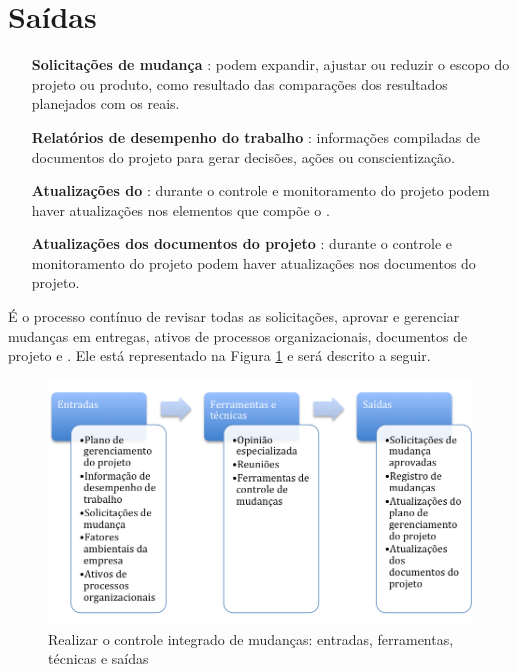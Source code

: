 \section{Saídas}

\begin{itemize}
	

	\item[\textbf{Solicitações de mudança}] : podem expandir, ajustar ou reduzir o escopo do projeto ou produto, como resultado das comparações dos resultados planejados com os reais.
	
	\item[\textbf{Relatórios de desempenho do trabalho}] : informações compiladas de documentos do projeto para gerar decisões, ações ou conscientização.

	\item[\textbf{Atualizações do \planproj}] :	durante o controle e monitoramento do projeto podem haver atualizações nos elementos que compõe o \planproj.
	
	\item[\textbf{Atualizações dos documentos do projeto}] : durante o controle e monitoramento do projeto podem haver atualizações nos documentos do projeto.
	
\end{itemize}


É o processo contínuo de revisar todas as solicitações, aprovar e gerenciar mudanças em entregas, ativos de processos organizacionais, documentos de projeto e \planproj. Ele está representado na Figura \ref{fig:cont:int:mudanca:etfs} e será descrito a seguir.

\begin{figure}[!h]
	\centering
	\includegraphics[scale=0.75]{Figuras/cont_int_mudanca_efts.png}
	\caption{Realizar o controle integrado de mudanças: entradas, ferramentas, técnicas e saídas}
	\label{fig:cont:int:mudanca:etfs}
\end{figure}

